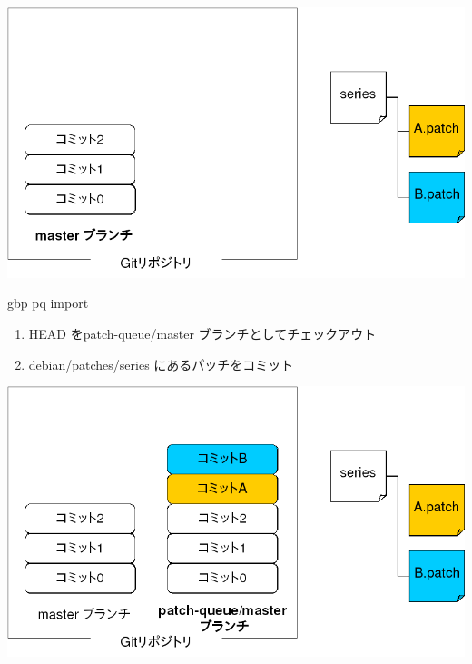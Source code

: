 \begin{frame}

\begin{center}
\includegraphics[width=0.8\hsize]{image201509/gbp-pq0.png}
\end{center}

\end{frame}

\begin{frame}{gbp pq import}

  \begin{enumerate}
   \item HEAD をpatch-queue/master ブランチとしてチェックアウト
   \item debian/patches/series にあるパッチをコミット
  \end{enumerate}

\begin{center}
\includegraphics[width=0.8\hsize]{image201509/gbp-pq1.png}
\end{center}

\end{frame}


